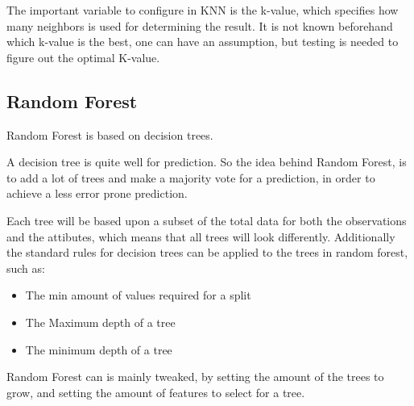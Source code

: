 \documentclass[report]{subfiles}
\begin{document}
The important variable to configure in KNN is the k-value, which specifies how many neighbors is used for determining the result. It is not known beforehand which k-value is the best, one can have an assumption, but testing is needed to figure out the optimal K-value.

\subsection{Random Forest}
\label{sec:theoryRandomForest}
Random Forest is based on decision trees. 

A decision tree is quite well for prediction. So the idea behind Random Forest, is to add a lot of trees and make a majority vote for a prediction, in order to achieve a less error prone prediction. 

Each tree will be based upon a subset of the total data for both the observations and the attibutes, which means that all trees will look differently. Additionally the standard rules for decision trees can be applied to the trees in random forest, such as:

\begin{itemize}
\item The min amount of values required for a split
\item The Maximum depth of a tree
\item The minimum depth of a tree
\end{itemize}

Random Forest can is mainly tweaked, by setting the amount of the trees to grow, and setting the amount of features to select for a tree. 
\end{document}
